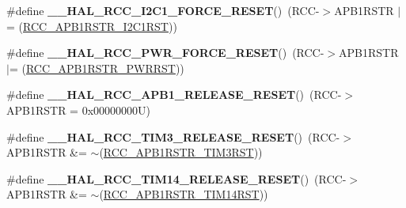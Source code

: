 \begin{DoxyCompactItemize}
\item 
\mbox{\label{group___r_c_c___a_p_b1___force___release___reset_ga551c171f88af86ca985db634ac9e3275}} 
\#define {\bfseries \+\_\+\+\_\+\+H\+A\+L\+\_\+\+R\+C\+C\+\_\+\+I2\+C1\+\_\+\+F\+O\+R\+C\+E\+\_\+\+R\+E\+S\+ET}()~(R\+CC-\/$>$A\+P\+B1\+R\+S\+TR $\vert$= (\hyperlink{group___peripheral___registers___bits___definition_gadcd25346a7d7b0009090adfbca899b93}{R\+C\+C\+\_\+\+A\+P\+B1\+R\+S\+T\+R\+\_\+\+I2\+C1\+R\+ST}))
\item 
\mbox{\label{group___r_c_c___a_p_b1___force___release___reset_gaf454341fae45fdfacfea2f45c07ce3e0}} 
\#define {\bfseries \+\_\+\+\_\+\+H\+A\+L\+\_\+\+R\+C\+C\+\_\+\+P\+W\+R\+\_\+\+F\+O\+R\+C\+E\+\_\+\+R\+E\+S\+ET}()~(R\+CC-\/$>$A\+P\+B1\+R\+S\+TR $\vert$= (\hyperlink{group___peripheral___registers___bits___definition_ga274d8cb48f0e89831efabea66d64af2a}{R\+C\+C\+\_\+\+A\+P\+B1\+R\+S\+T\+R\+\_\+\+P\+W\+R\+R\+ST}))
\item 
\mbox{\label{group___r_c_c___a_p_b1___force___release___reset_ga9d0742ab271ace3dbe1a4e83de3d017b}} 
\#define {\bfseries \+\_\+\+\_\+\+H\+A\+L\+\_\+\+R\+C\+C\+\_\+\+A\+P\+B1\+\_\+\+R\+E\+L\+E\+A\+S\+E\+\_\+\+R\+E\+S\+ET}()~(R\+CC-\/$>$A\+P\+B1\+R\+S\+TR = 0x00000000\+U)
\item 
\mbox{\label{group___r_c_c___a_p_b1___force___release___reset_ga27cf9c39217fff6ae9bce2285d9aff8c}} 
\#define {\bfseries \+\_\+\+\_\+\+H\+A\+L\+\_\+\+R\+C\+C\+\_\+\+T\+I\+M3\+\_\+\+R\+E\+L\+E\+A\+S\+E\+\_\+\+R\+E\+S\+ET}()~(R\+CC-\/$>$A\+P\+B1\+R\+S\+TR \&= $\sim$(\hyperlink{group___peripheral___registers___bits___definition_ga8680c562fd372b494a160594525d7ce9}{R\+C\+C\+\_\+\+A\+P\+B1\+R\+S\+T\+R\+\_\+\+T\+I\+M3\+R\+ST}))
\item 
\mbox{\label{group___r_c_c___a_p_b1___force___release___reset_ga241bf274a6fba46a49b50aedaf1e08d3}} 
\#define {\bfseries \+\_\+\+\_\+\+H\+A\+L\+\_\+\+R\+C\+C\+\_\+\+T\+I\+M14\+\_\+\+R\+E\+L\+E\+A\+S\+E\+\_\+\+R\+E\+S\+ET}()~(R\+CC-\/$>$A\+P\+B1\+R\+S\+TR \&= $\sim$(\hyperlink{group___peripheral___registers___bits___definition_ga773e6d5b419eb2d4b6291c862e04b002}{R\+C\+C\+\_\+\+A\+P\+B1\+R\+S\+T\+R\+\_\+\+T\+I\+M14\+R\+ST}))

\end{DoxyCompactItemize}

